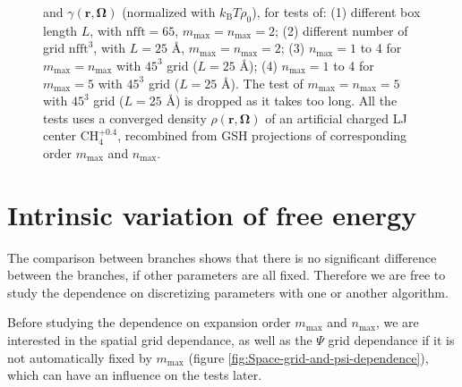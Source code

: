 \begin{figure}[!th]
{and $\gamma(\mathbf{r},\mathbf{\Omega})$ (normalized with $k_{\mathrm{B}}T\rho_{0}$),
for tests of: (1) different box length $L$, with $\mathrm{nfft}=65$,
$m_{\max}=n_{\max}=2$; (2) different number of grid $\mathrm{nfft}^{3}$,
with $L=25$ $\textrm{Å}$, $m_{\max}=n_{\max}=2$; (3) $n_{\max}=1$
to 4 for $m_{\max}=n_{\max}$ with $45^{3}$ grid ($L=25$ $\textrm{Å}$);
(4) $n_{\max}=1$ to 4 for $m_{\max}=5$ with $45^{3}$ grid ($L=25$
$\textrm{Å}$). The test of $m_{\max}=n_{\max}=5$ with $45^{3}$
grid ($L=25$ $\textrm{Å}$) is dropped as it takes too long. All
the tests uses a converged density $\rho(\mathbf{r},\mathbf{\Omega})$
of an artificial charged LJ center $\mathrm{CH}_{4}^{+0.4}$, recombined
from \acs{GSH} projections of corresponding order $m_{\max}$ and
$n_{\max}$. \label{fig:Difference-in-gamma}}
\end{figure}


\section{Intrinsic variation of free energy\label{sec:Intrinsic-variation-of}}

The comparison between branches shows that there is no significant
difference between the branches, if other parameters are all fixed.
Therefore we are free to study the dependence on discretizing parameters
with one or another algorithm. 

Before studying the dependence on expansion order $m_{\max}$ and
$n_{\max}$, we are interested in the spatial grid dependance, as
well as the $\Psi$ grid dependance if it is not automatically fixed
by $m_{\max}$ (figure \ref{fig:Space-grid-and-psi-dependence}),
which can have an influence on the tests later.

